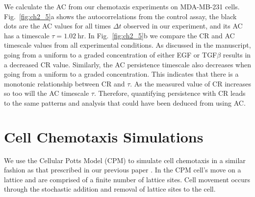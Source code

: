 We calculate the AC from our chemotaxis experiments on MDA-MB-231 cells. Fig.\ \ref{fig:ch2_5}a shows the autocorrelations from the control assay, the black dots are the AC values for all times $\Delta t$ observed in our experiment, and its AC has a timescale
$\tau = 1.02 \ \text{hr}$.
In Fig.\ \ref{fig:ch2_5}b we compare the CR and AC timescale values from all experimental conditions. As discussed in the manuscript, going from a uniform to a graded concentration of either EGF or TGF$\beta$ results in a decreased CR value. Similarly, the AC persistence timescale also decreases when going from a uniform to a graded concentration. This indicates that there is a monotonic relationship between CR and $\tau$. As the measured value of CR increases so too will the AC timescale $\tau$. Therefore, quantifying persistence with CR leads to the same patterns and analysis that could have been deduced from using AC.


\section{Cell Chemotaxis Simulations}


We use the Cellular Potts Model (CPM) to simulate cell chemotaxis in a similar fashion as that prescribed in our previous paper . In the CPM cell's move on a lattice and are comprised of a finite number of lattice sites. Cell movement occurs through the stochastic addition and removal of lattice sites to the cell.

